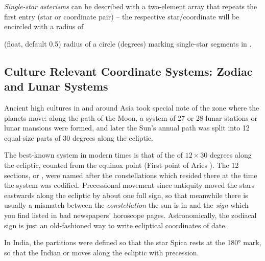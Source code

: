 \begin{description}
					\emph{Single-star asterisms}  can be described with a two-element array that repeats the first entry (star or coordinate pair)
					-- the respective star/coordinate will be encircled with a radius of
\item[\jtag{single\_star\_radius}] (float, default 0.5)  radius of a circle (degrees) marking single-star segments in .
\end{description}


\subsection{Culture Relevant Coordinate Systems: Zodiac and Lunar Systems}
\label{sec:skycultures:skyPartitions}
\label{SC:zodiac_lunarSystem}

Ancient high cultures in and around Asia took special note of the zone where the planets move: 
along the path of the Moon, a system of 27 or 28 lunar stations or lunar mansions were formed, 
and later the Sun's annual path was split into 12 equal-size parts of 30 degrees along the ecliptic.

The best-known system in modern times is that of the  of $12\times30$ degrees along the ecliptic, 
counted from the equinox point (First point of Aries \Aries). The 12 sections, or , 
were named after the constellations which resided there at the time the system was codified. 
Precessional movement since antiquity moved the stars eastwards along the ecliptic by about one full sign, so that meanwhile there is usually 
a mismatch between the \emph{constellation} the sun is in and the \emph{sign} which you find listed in bad newspapers' horoscope pages. 
Astronomically, the zodiacal sign is just an old-fashioned way to write ecliptical coordinates of date.  

In India, the partitions were defined so that the star Spica rests at the 180° mark, 
so that the Indian or  moves along the ecliptic with precession. 

